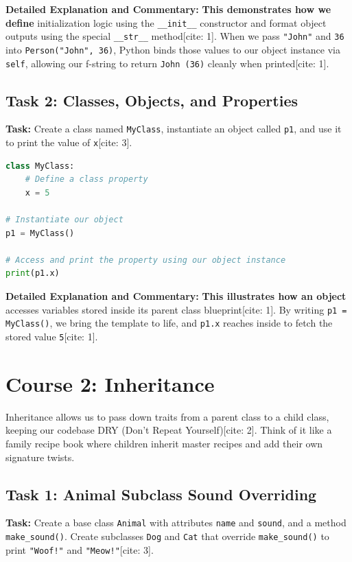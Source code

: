 \documentclass[12pt,a4paper]{article}
\begin{document}
\noindent\textbf{Detailed Explanation and Commentary:}
\textbf{This demonstrates how we define} initialization logic using the \texttt{\_\_init\_\_} constructor and format object outputs using the special \texttt{\_\_str\_\_} method[cite: 1]. When we pass \texttt{"John"} and \texttt{36} into \texttt{Person("John", 36)}, Python binds those values to our object instance via \texttt{self}, allowing our f-string to return \texttt{John (36)} cleanly when printed[cite: 1].

\begin{center}
\end{center}

\subsection*{Task 2: Classes, Objects, and Properties}
\textbf{Task:} Create a class named \texttt{MyClass}, instantiate an object called \texttt{p1}, and use it to print the value of \texttt{x}[cite: 3].

\begin{lstlisting}[language=Python]
class MyClass:
    # Define a class property
    x = 5

# Instantiate our object
p1 = MyClass()

# Access and print the property using our object instance
print(p1.x)
\end{lstlisting}

\noindent\textbf{Detailed Explanation and Commentary:}
\textbf{This illustrates how an object} accesses variables stored inside its parent class blueprint[cite: 1]. By writing \texttt{p1 = MyClass()}, we bring the template to life, and \texttt{p1.x} reaches inside to fetch the stored value \texttt{5}[cite: 1].

\section*{Course 2: Inheritance 🧬✨}
Inheritance allows us to pass down traits from a parent class to a child class, keeping our codebase DRY (Don't Repeat Yourself)[cite: 2]. Think of it like a family recipe book where children inherit master recipes and add their own signature twists.

\subsection*{Task 1: Animal Subclass Sound Overriding}
\textbf{Task:} Create a base class \texttt{Animal} with attributes \texttt{name} and \texttt{sound}, and a method \texttt{make_sound()}. Create subclasses \texttt{Dog} and \texttt{Cat} that override \texttt{make_sound()} to print \texttt{"Woof!"} and \texttt{"Meow!"}[cite: 3].
\end{document}
